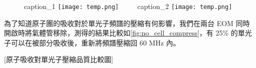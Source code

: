 \documentclass[class=NCU_thesis, crop=false]{standalone}
\begin{document}
\begin{figure}[!hbt]
    \centering
    \subcaptionbox
        {caption\_1
        \label{fig:spread_single_photon_with_etalon}}
        {\texttt{[image: temp.png]}}
    ~~~~
    \subcaptionbox
        {caption\_2
        \label{fig:compress_single_photon_with_etalon『}}
        {\texttt{[image: temp.png]}}
\end{figure}

為了知道原子團的吸收對於單光子頻譜的壓縮有何影響，我們在兩台 EOM 同時開啟時將氣體管移除，測得的結果比較如\cref{fig:no_cell_compress}，有 25\% 的單光子可以在被部分吸收後，重新將頻譜壓縮回 60 MHz 內。

[原子吸收對單光子壓縮品質比較圖]
\end{document}
